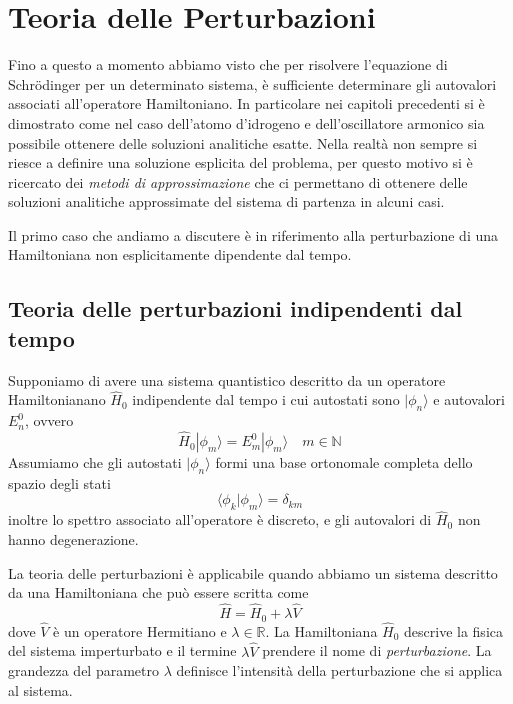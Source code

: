 \setcounter{chapter}{4}
\chapter{Teoria delle Perturbazioni}

Fino a questo a momento abbiamo visto che per risolvere l'equazione di Schr\"odinger per un determinato sistema, \`e sufficiente determinare gli autovalori associati all'operatore Hamiltoniano. In particolare nei capitoli precedenti si \`e dimostrato come nel caso dell'atomo d'idrogeno e dell'oscillatore armonico sia possibile ottenere delle soluzioni analitiche esatte. Nella realt\`a non sempre si riesce a definire una soluzione esplicita del problema, per questo motivo si \`e ricercato dei \textit{metodi di approssimazione} che ci permettano di ottenere delle soluzioni analitiche approssimate del sistema di partenza in alcuni casi.

Il primo caso che andiamo a discutere \`e in riferimento alla perturbazione di una Hamiltoniana non esplicitamente dipendente dal tempo.


\section{Teoria delle perturbazioni indipendenti dal tempo}

Supponiamo  di avere una sistema quantistico descritto da un operatore Hamiltonianano $\hat{H}_0$ indipendente dal tempo i cui autostati sono $|\phi_n \rangle $ e autovalori $E_{n}^0$, ovvero
\begin{equation*}
	\hat{H}_0 |\phi_m \rangle = E_m^0 | \phi_{m} \rangle \quad m \in \mathbb{N}
\end{equation*} 
Assumiamo che gli autostati $\vert \phi_n \rangle$ formi una base ortonomale completa dello spazio degli stati
\begin{equation*}
	\langle \phi_{k} | \phi_m \rangle = \delta_{km}
\end{equation*}
inoltre lo spettro associato all'operatore \`e discreto, e gli autovalori di $\hat{H}_0$ non hanno degenerazione.

La teoria delle perturbazioni \`e applicabile quando abbiamo un sistema descritto da una Hamiltoniana che pu\`o essere scritta come
\begin{equation}
	\hat{H} =  \hat{H}_0 + \lambda \hat{V}
\end{equation}
dove $\hat{V}$ \`e un operatore Hermitiano e $\lambda \in \mathbb{R}$. La Hamiltoniana $\hat{H}_0$ descrive la fisica del sistema imperturbato e il termine $\lambda \hat{V}$ prendere il nome di \textit{perturbazione}. La grandezza del parametro $\lambda$  definisce l'intensit\`a della perturbazione che si applica al sistema.

